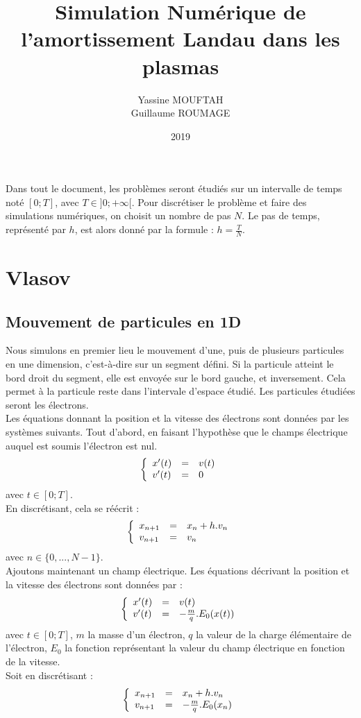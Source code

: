 \documentclass{article}
\title{Simulation Numérique de l'amortissement Landau dans les plasmas}
\date{2019}
\author{Yassine MOUFTAH\\Guillaume ROUMAGE}
\begin{document}
\maketitle
\newpage
\noindent Dans tout le document, les problèmes seront étudiés sur un intervalle de temps noté $[0;T]$, avec $T \in ]0; + \infty[$. Pour discrétiser le problème et faire des simulations numériques, on choisit un nombre de pas $N$. Le pas de temps, représenté par $h$, est alors donné par la formule : $h = \frac{T}{N}$.
\newpage
\section*{Vlasov}
\subsection*{Mouvement de particules en 1D}
Nous simulons en premier lieu le mouvement d'une, puis de plusieurs particules en une dimension, c'est-à-dire sur un segment défini. Si la particule atteint le bord droit du segment, elle est envoyée sur le bord gauche, et inversement. Cela permet à la particule reste dans l'intervale d'espace étudié. Les particules étudiées seront les électrons.\\
Les équations donnant la position et la vitesse des électrons sont données par les systèmes suivants. Tout d'abord, en faisant l'hypothèse que le champs électrique auquel est soumis l'électron est nul.
$$
\left \{
   \begin{array}{l l l}
      x'(t)  & = & v(t) \\
      v'(t)  & = & 0 \\
	\end{array}
\right.
$$
avec $t \in [0;T]$.\\
En discrétisant, cela se réécrit :
$$
\left \{
   \begin{array}{l l l}
      x_{n+1}  & = & x_n + h.v_n \\
      v_{n+1}  & = & v_n \\
	\end{array}
\right.
$$
avec $n \in \{0,...,N-1\}$.\\
Ajoutons maintenant un champ électrique. Les équations décrivant la position et la vitesse des électrons sont données par :
$$
\left \{
   \begin{array}{l l l}
      x'(t)  & = & v(t) \\
      v'(t)  & = & -\frac{m}{q}.E_0(x(t)) \\
	\end{array}
\right.
$$
avec $t \in [0;T]$, $m$ la masse d'un électron, $q$ la valeur de la charge élémentaire de l'électron, $E_0$ la fonction représentant la valeur du champ électrique en fonction de la vitesse.\\
Soit en discrétisant :
$$
\left \{
   \begin{array}{l l l}
      x_{n+1}  & = & x_n + h.v_n \\
      v_{n+1}  & = & -\frac{m}{q}.E_0(x_n) \\
	\end{array}
\right.
$$
\end{document}
